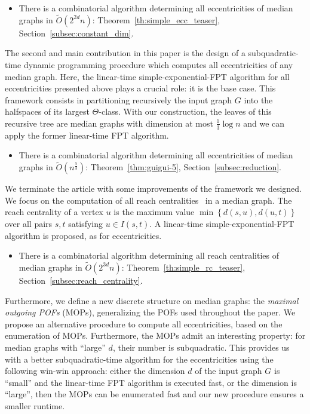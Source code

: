 \documentclass[a4paper,UKenglish,numberwithinsect,cleveref, autoref]{lipics-v2021}
\newcommand{\set}[1]{\left\{ #1 \right\}}
\begin{document}
\begin{itemize}
\item There is a combinatorial algorithm determining all eccentricities of median graphs in $\tilde{O}(2^{2d}n)$: Theorem~\ref{th:simple_ecc_teaser}, Section~\ref{subsec:constant_dim}.
\end{itemize}

The second and main contribution in this paper is the design of a subquadratic-time dynamic programming procedure which computes all eccentricities of any median graph. Here, the linear-time simple-exponential-FPT algorithm for all eccentricities presented above plays a crucial role: it is the base case. This framework consists in partitioning recursively the input graph $G$ into the halfspaces of its largest $\Theta$-class. With our construction, the leaves of this recursive tree are median graphs with dimension at most $\frac{1}{3}\log n$ and we can apply the former linear-time FPT algorithm.

\begin{itemize}
    \item There is a combinatorial algorithm determining all eccentricities of median graphs in $\tilde{O}(n^{\frac{5}{3}})$: Theorem~\ref{thm:guigui-5}, Section~\ref{subsec:reduction}.
\end{itemize}

We terminate the article with some improvements of the framework we designed. We focus on the computation of all reach centralities~\cite{Gu04} in a median graph. The reach centrality of a vertex $u$ is the maximum value $\min \set{d(s,u),d(u,t)}$ over all pairs $s,t$ satisfying $u \in I(s,t)$. A linear-time simple-exponential-FPT algorithm is proposed, as for eccentricities.

\begin{itemize}
    \item There is a combinatorial algorithm determining all reach centralities of median graphs in $\tilde{O}(2^{3d}n)$: Theorem~\ref{th:simple_rc_teaser}, Section~\ref{subsec:reach_centrality}.
\end{itemize}

Furthermore, we define a new discrete structure on median graphs: the \textit{maximal outgoing POFs} (MOPs), generalizing the POFs used throughout the paper. We propose an alternative procedure to compute all eccentricities, based on the enumeration of MOPs. Furthermore, the MOPs admit an interesting property: for median graphs with ``large'' $d$, their number is subquadratic. This provides us with a better subquadratic-time algorithm for the eccentricities using the following win-win approach: either the dimension $d$ of the input graph $G$ is ``small'' and the linear-time FPT algorithm is executed fast, or the dimension is ``large'', then the MOPs can be enumerated fast and our new procedure ensures a smaller runtime.
\end{document}
